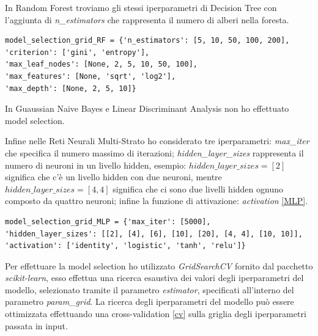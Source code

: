 \documentclass[12pt,italian]{report}
\begin{document}
\newpage
In Random Forest troviamo gli stessi iperparametri di Decision Tree con l'aggiunta di \emph{n\_estimators} che rappresenta il numero di  alberi nella foresta.

\begin{lstlisting}[frame=single, basicstyle=\footnotesize]
model_selection_grid_RF = {'n_estimators': [5, 10, 50, 100, 200],
'criterion': ['gini', 'entropy'],
'max_leaf_nodes': [None, 2, 5, 10, 50, 100],
'max_features': [None, 'sqrt', 'log2'],
'max_depth': [None, 2, 5, 10]}
\end{lstlisting}


In Guaussian Naive Bayes e Linear Discriminant Analysis non ho effettuato model selection.

Infine nelle Reti Neurali Multi-Strato ho considerato tre iperparametri: \emph{max\_iter} che specifica il numero massimo di iterazioni; \emph{hidden\_layer\_sizes} rappresenta il numero di neuroni in un livello hidden, esempio: $hidden\_layer\_sizes=[2]$ significa che c'è un livello hidden con due neuroni, mentre $hidden\_layer\_sizes=[4, 4]$ significa che ci sono due livelli hidden ognuno composto da quattro neuroni; infine la funzione di attivazione: \emph{activation} \ref{MLP}.
\begin{lstlisting}[frame=single, basicstyle=\footnotesize]
model_selection_grid_MLP = {'max_iter': [5000],
'hidden_layer_sizes': [[2], [4], [6], [10], [20], [4, 4], [10, 10]],
'activation': ['identity', 'logistic', 'tanh', 'relu']}
\end{lstlisting}


Per effettuare la model selection ho utilizzato \emph{GridSearchCV} fornito dal pacchetto \emph{scikit-learn}, esso effettua una ricerca esaustiva dei valori degli iperparametri del modello, selezionato tramite il parametro \emph{estimator}, specificati all'interno del parametro \emph{param\_grid}. La ricerca degli iperparametri del modello può essere ottimizzata effettuando una cross-validation \ref{cv} sulla griglia degli iperparametri passata in input.
\end{document}
